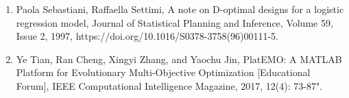 \documentclass[11pt,a4paper]{article}
\begin{document}
\begin{enumerate}
\item Paola Sebastiani, Raffaella Settimi,
A note on D-optimal designs for a logistic regression model,
Journal of Statistical Planning and Inference,
Volume 59, Issue 2, 
1997, 
https://doi.org/10.1016/S0378-3758(96)00111-5.

\item Ye Tian, Ran Cheng, Xingyi Zhang, and Yaochu Jin, PlatEMO: A MATLAB Platform for Evolutionary Multi-Objective Optimization [Educational Forum], IEEE Computational Intelligence Magazine, 2017, 12(4): 73-87".

\end{enumerate}
\end{document}
